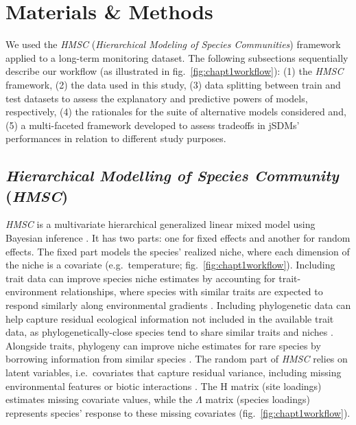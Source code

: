 \documentclass[9pt,biorxiv,doublespacing,lineno]{lapreprint}
\begin{document}
\hypertarget{materials-methods}{%
\section{Materials \& Methods}\label{materials-methods}}

We used the \emph{HMSC} (\emph{Hierarchical Modeling of Species
Communities}) framework applied to a long-term monitoring dataset. The
following subsections sequentially describe our workflow (as illustrated
in fig.~\ref{fig:chapt1workflow}): (1) the \emph{HMSC} framework, (2)
the data used in this study, (3) data splitting between train and test
datasets to assess the explanatory and predictive powers of models,
respectively, (4) the rationales for the suite of alternative models
considered and, (5) a multi-faceted framework developed to assess
tradeoffs in jSDMs' performances in relation to different study
purposes.

\hypertarget{hierarchical-modelling-of-species-community-hmsc}{%
\subsection{\texorpdfstring{\emph{Hierarchical Modelling of Species
Community}
(\emph{HMSC})}{Hierarchical Modelling of Species Community (HMSC)}}\label{hierarchical-modelling-of-species-community-hmsc}}

\emph{HMSC} is a multivariate hierarchical generalized linear mixed
model using Bayesian inference \autocite{Ovaskainen_2020}. It has two
parts: one for fixed effects and another for random effects. The fixed
part models the species' realized niche, where each dimension of the
niche is a covariate (e.g.~temperature; fig.~\ref{fig:chapt1workflow}).
Including trait data can improve species niche estimates by accounting
for trait-environment relationships, where species with similar traits
are expected to respond similarly along environmental gradients
\autocite{Ovaskainen_2017a}. Including phylogenetic data can help
capture residual ecological information not included in the available
trait data, as phylogenetically-close species tend to share similar
traits and niches \autocite{Wiens_2010}. Alongside traits, phylogeny can
improve niche estimates for rare species by borrowing information from
similar species \autocites[ ]{Ovaskainen_2017a}[
]{Ovaskainen_2017b}{Ovaskainen_2020}. The random part of \emph{HMSC}
relies on latent variables, i.e.~covariates that capture residual
variance, including missing environmental features or biotic
interactions \autocites[ ]{Ovaskainen_2017a}[
]{Ovaskainen_2017b}{Ovaskainen_2020}. The H matrix (site loadings)
estimates missing covariate values, while the \(\Lambda\) matrix
(species loadings) represents species' response to these missing
covariates (fig.~\ref{fig:chapt1workflow}).
\end{document}

